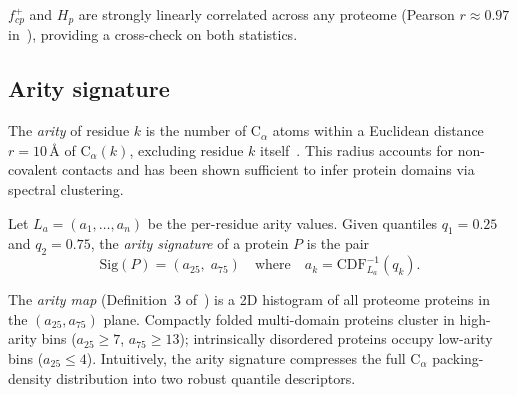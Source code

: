 $f^+_{cp}$ and $H_p$ are strongly linearly correlated across any proteome
(Pearson $r \approx 0.97$ in~\cite{cazals2025alphafold}), providing a
cross-check on both statistics.

\subsection{Arity signature}
\label{sec:bg_arity}

The \emph{arity} of residue $k$ is the number of $\mathrm{C}_\alpha$ atoms
within a Euclidean distance $r = 10$\,\AA{} of $\mathrm{C}_\alpha(k)$,
excluding residue $k$ itself~\cite{cazals2025alphafold}.
This radius accounts for non-covalent contacts and has been shown sufficient
to infer protein domains via spectral clustering.

\begin{definition}
\label{def:arity_sig}
Let $L_a = (a_1,\ldots,a_n)$ be the per-residue arity values.
Given quantiles $q_1 = 0.25$ and $q_2 = 0.75$, the \emph{arity signature}
of a protein $P$ is the pair
\[
  \mathrm{Sig}(P) = (a_{25},\;a_{75})
  \quad\text{where}\quad
  a_k = \mathrm{CDF}_{L_a}^{-1}(q_k).
\]
\end{definition}

The \emph{arity map} (Definition~3 of~\cite{cazals2025alphafold}) is a
2D histogram of all proteome proteins in the $(a_{25}, a_{75})$ plane.
Compactly folded multi-domain proteins cluster in high-arity bins
($a_{25} \geq 7$, $a_{75} \geq 13$); intrinsically disordered proteins
occupy low-arity bins ($a_{25} \leq 4$).
Intuitively, the arity signature compresses the full $\mathrm{C}_\alpha$
packing-density distribution into two robust quantile descriptors.
